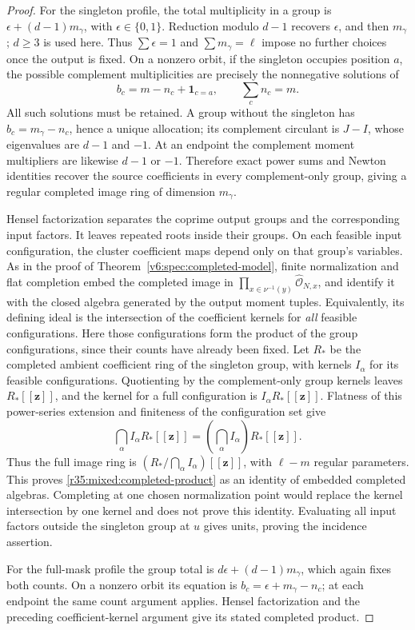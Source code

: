 \documentclass[10pt,fleqn]{article}
\numberwithin{equation}{section}
\begin{document}
\begin{proof}
For the singleton profile, the total multiplicity in a group is
$\epsilon+(d-1)m_\gamma$, with $\epsilon\in\{0,1\}$.
Reduction modulo $d-1$ recovers $\epsilon$, and then $m_\gamma$;
$d\ge3$ is used here.  Thus $\sum\epsilon=1$ and
$\sum m_\gamma=\ell$ impose no further choices once the output is fixed.
On a nonzero orbit, if the singleton occupies position $a$, the
possible complement multiplicities are precisely the nonnegative
solutions of
\[
 b_c=m-n_c+\mathbf1_{c=a},\qquad \sum_cn_c=m.
\]
All such solutions must be retained.  A group without the singleton has
$b_c=m_\gamma-n_c$, hence a unique allocation; its complement circulant
is $J-I$, whose eigenvalues are $d-1$ and $-1$.
At an endpoint the complement moment multipliers are likewise $d-1$
or $-1$.  Therefore exact power sums and Newton identities recover the
source coefficients in every complement-only group, giving a regular
completed image ring of dimension $m_\gamma$.

Hensel factorization separates the coprime output groups and the
corresponding input factors.  It leaves repeated roots inside their
groups.  On each feasible input configuration, the cluster coefficient
maps depend only on that group's variables.  As in the proof of
Theorem~\ref{v6:spec:completed-model}, finite normalization and flat
completion embed the completed image in
$\prod_{x\in\nu^{-1}(y)}\widehat{\mathcal O}_{N,x}$, and identify it
with the closed algebra generated by the output moment tuples.
Equivalently, its defining ideal is the intersection of the coefficient
kernels for \emph{all} feasible configurations.  Here those configurations
form the product of the group configurations, since their counts have
already been fixed.  Let $R_*$ be the completed ambient coefficient ring
of the singleton group, with kernels $I_\alpha$ for its feasible
configurations.  Quotienting by the complement-only group kernels leaves
$R_*[[\mathbf z]]$, and the kernel for a full configuration is
$I_\alpha R_*[[\mathbf z]]$.  Flatness of this power-series extension
and finiteness of the configuration set give
\[
 \bigcap_\alpha I_\alpha R_*[[\mathbf z]]
 =\left(\bigcap_\alpha I_\alpha\right)R_*[[\mathbf z]].
\]
Thus the full image ring is
$(R_*/\bigcap_\alpha I_\alpha)[[\mathbf z]]$, with $\ell-m$ regular
parameters.  This proves \eqref{r35:mixed:completed-product}
as an identity of embedded completed algebras.  Completing at one chosen
normalization point would replace the kernel intersection by one kernel
and does not prove this identity.  Evaluating all input factors outside
the singleton group at $u$ gives units, proving the incidence assertion.

For the full-mask profile the group total is
$d\epsilon+(d-1)m_\gamma$, which again fixes both counts.  On a nonzero
orbit its equation is $b_c=\epsilon+m_\gamma-n_c$; at each endpoint the
same count argument applies.  Hensel factorization and the preceding
coefficient-kernel argument give its stated completed product.
\end{proof}
\end{document}
